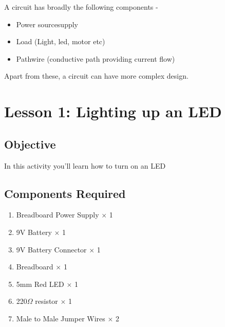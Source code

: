 A circuit has broadly the following components -
\begin{itemize}
    \item Power source\/supply
    \item Load (Light, led, motor etc)
    \item Path\/wire (conductive path providing current flow)
\end{itemize}
Apart from these, a circuit can have more complex design.
\clearpage

\section{Lesson 1: Lighting up an LED}
\subsection{Objective}
In this activity you'll learn how to turn on an LED
\subsection{Components Required}
\begin{enumerate}
    \item Breadboard Power Supply $\times$ 1
    \item 9V Battery $\times$ 1 
    \item 9V Battery Connector $\times$ 1
    \item Breadboard $\times$ 1
    \item 5mm Red LED $\times$ 1
    \item 220$\Omega$ resistor $\times$ 1
    \item Male to Male Jumper Wires $\times$ 2
\end{enumerate}
